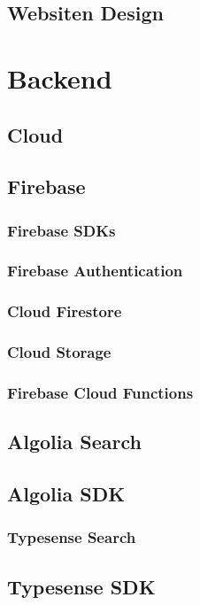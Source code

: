 \subsection{Websiten Design}

\section{Backend}
\subsection{Cloud}
\subsection{Firebase}
\subsubsection{Firebase SDKs}

\subsubsection{Firebase Authentication}


\subsubsection{Cloud Firestore}
\subsubsection{Cloud Storage}
\subsubsection{Firebase Cloud Functions}
\subsection{Algolia Search}
\subsection{Algolia SDK}

\subsubsection{Typesense Search}
\subsection{Typesense SDK}
